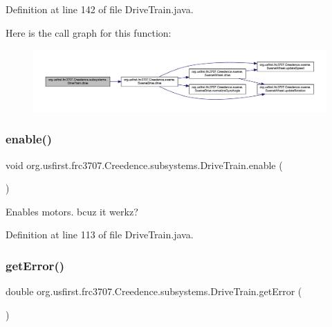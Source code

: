 Definition at line 142 of file Drive\+Train.\+java.

Here is the call graph for this function\+:
\nopagebreak
\begin{figure}[H]
\begin{center}
\leavevmode
\includegraphics[width=350pt]{classorg_1_1usfirst_1_1frc3707_1_1_creedence_1_1subsystems_1_1_drive_train_a031616877c101a96e107705b01027032_cgraph}
\end{center}
\end{figure}
\mbox{\label{classorg_1_1usfirst_1_1frc3707_1_1_creedence_1_1subsystems_1_1_drive_train_a31349bde0f794f11ed737f92a5e92c97}} 
\subsubsection{\texorpdfstring{enable()}{enable()}}
{\footnotesize\ttfamily void org.\+usfirst.\+frc3707.\+Creedence.\+subsystems.\+Drive\+Train.\+enable (\begin{DoxyParamCaption}{ }\end{DoxyParamCaption})}

Enables motors. bcuz it werkz? 

Definition at line 113 of file Drive\+Train.\+java.

\mbox{\label{classorg_1_1usfirst_1_1frc3707_1_1_creedence_1_1subsystems_1_1_drive_train_a0d86aea6052e1c19c0a7c3c9f263573b}} 
\subsubsection{\texorpdfstring{getError()}{getError()}}
{\footnotesize\ttfamily double org.\+usfirst.\+frc3707.\+Creedence.\+subsystems.\+Drive\+Train.\+get\+Error (\begin{DoxyParamCaption}{ }\end{DoxyParamCaption})}

